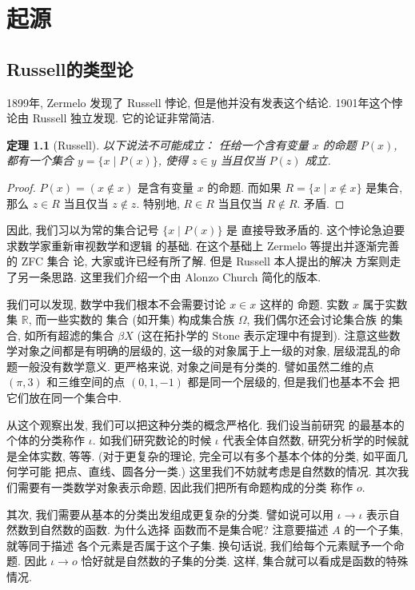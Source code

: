 \documentclass[UTF8]{ctexbook}
\theoremstyle{plain}
\newtheorem{theorem}{定理}[chapter]
\theoremstyle{definition}
\theoremstyle{remark}
\begin{document}
\chapter{起源}
\section{Russell的类型论} %
1899年, Zermelo 发现了 Russell 悖论,
但是他并没有发表这个结论.
1901年这个悖论由 Russell 独立发现.
它的论证非常简洁.
\begin{theorem}[Russell]
以下说法不可能成立： 任给一个含有变量 \(x\) 的命题 \(P(x)\),
都有一个集合 \(y = \{x \mid P(x)\}\), 使得
\(z \in y\) 当且仅当 \(P(z)\) 成立.
\end{theorem}
\begin{proof}
\(P(x) = (x \notin x)\) 是含有变量 \(x\) 的命题.
而如果 \(R = \{x \mid x \notin x\}\) 是集合,
那么 \(z \in R\) 当且仅当 \(z \notin z\).
特别地, \(R \in R\) 当且仅当 \(R \notin R\).
矛盾.
\end{proof}
因此, 我们习以为常的集合记号 \(\{x \mid P(x)\}\) 是
直接导致矛盾的. 这个悖论急迫要求数学家重新审视数学和逻辑
的基础. 在这个基础上 Zermelo 等提出并逐渐完善的 ZFC 集合
论, 大家或许已经有所了解. 但是 Russell 本人提出的解决
方案则走了另一条思路. 这里我们介绍一个由 Alonzo Church 简化的版本.%
\cite{sep:2022:typetheory}

我们可以发现, 数学中我们根本不会需要讨论 \(x \in x\) 这样的
命题. 实数 \(x\) 属于实数集 \(\mathbb R\), 而一些实数的
集合 (如开集) 构成集合族 \(\Omega\), 我们偶尔还会讨论集合族
的集合, 如所有超滤的集合 \(\beta X\) (这在拓扑学的
Stone 表示定理中有提到). 注意这些数学对象之间都是有明确的层级的,
这一级的对象属于上一级的对象, 层级混乱的命题一般没有数学意义.
更严格来说, 对象之间是有分类的. 譬如虽然二维的点 \((\pi, 3)\)
和三维空间的点 \((0,1,-1)\) 都是同一个层级的, 但是我们也基本不会
把它们放在同一个集合中.

从这个观察出发, 我们可以把这种分类的概念严格化. 我们设当前研究
的最基本的个体的分类称作 \(\iota\). 如我们研究数论的时候
\(\iota\) 代表全体自然数, 研究分析学的时候就是全体实数, 等等.
(对于更复杂的理论, 完全可以有多个基本个体的分类, 如平面几何学可能
把点、直线、圆各分一类.) 这里我们不妨就考虑是自然数的情况.
其次我们需要有一类数学对象表示命题, 因此我们把所有命题构成的分类
称作 \(o\).

其次, 我们需要从基本的分类出发组成更复杂的分类. 譬如说可以用
\(\iota \to \iota\) 表示自然数到自然数的函数. 为什么选择
函数而不是集合呢? 注意要描述 \(A\) 的一个子集, 就等同于描述
各个元素是否属于这个子集. 换句话说, 我们给每个元素赋予一个命题.
因此 \(\iota \to o\) 恰好就是自然数的子集的分类. 这样,
集合就可以看成是函数的特殊情况.
\end{document}
